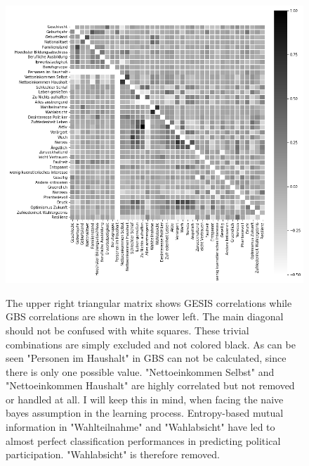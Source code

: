 \begin{appendices}
\begin{figure}[ht]
	\begin{center}
		\includegraphics[scale=0.73,angle=0]{fig/correl}
		\label{corr}
		\caption{The upper right triangular matrix shows GESIS correlations while GBS correlations are shown in the lower left. The main diagonal should not be confused with white squares. These trivial combinations are simply excluded and not colored black. As can be seen "Personen im Haushalt" in GBS can not be calculated, since there is only one possible value. "Nettoeinkommen Selbst" and "Nettoeinkommen Haushalt" are highly correlated but not removed or handled at all. I will keep this in mind, when facing the naive bayes assumption in the learning process. Entropy-based mutual information in "Wahlteilnahme" and "Wahlabsicht" have led to almost perfect classification performances in predicting political participation. "Wahlabsicht" is therefore removed.}
	\end{center}
\end{figure}



\end{appendices}
